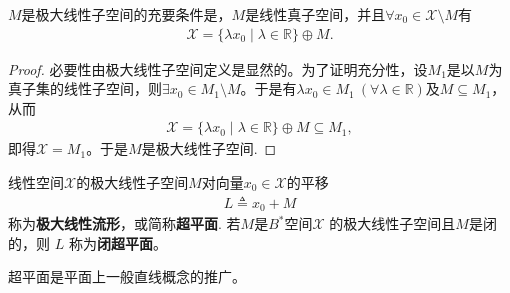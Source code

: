 \documentclass[../../main.tex]{subfiles}%
\begin{document}
\begin{proposition}\label{proposition:极大线性子空间诱导空间直和分解}
$M$是极大线性子空间的充要条件是，$M$是线性真子空间，并且$\forall x_0 \in \mathscr{X} \setminus M$有
\begin{align*}
\mathscr{X} = \{\lambda x_0 \mid \lambda \in \mathbb{R}\} \oplus M.
\end{align*}
\end{proposition}
\begin{proof}

必要性由极大线性子空间定义是显然的。为了证明充分性，设$M_1$是以$M$为真子集的线性子空间，则$\exists x_0 \in M_1 \setminus M$。于是有$\lambda x_0 \in M_1 \ (\forall \lambda \in \mathbb{R})$及$M \subseteq M_1$，从而
\begin{align*}
\mathscr{X} = \{\lambda x_0 \mid \lambda \in \mathbb{R}\} \oplus M \subseteq M_1,
\end{align*}
即得$\mathscr{X} = M_1$。于是$M$是极大线性子空间.

\end{proof}

\begin{definition}
线性空间$\mathscr{X}$的极大线性子空间$M$对向量$x_0 \in \mathscr{X}$的平移
\begin{align*}
L \triangleq x_0 + M
\end{align*}
称为\textbf{极大线性流形}，或简称\textbf{超平面}.
若$M$是$B^*$空间$\mathscr{X}$ 的极大线性子空间且$M$是闭的，则 $L$ 称为\textbf{闭超平面}。
\end{definition}
\begin{remark}
超平面是平面上一般直线概念的推广。
\end{remark}
\end{document}

